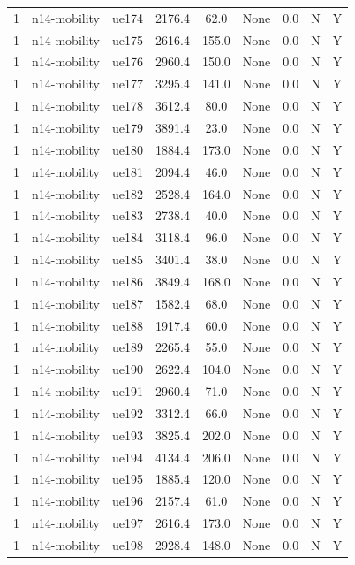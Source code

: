 \begin{table}[ht]
\begin{tabular}{|c|c|c|c|c|c|c|c|c|}
1 & n14-mobility & ue174 & 2176.4 & 62.0 & None & 0.0 & N & Y \\
1 & n14-mobility & ue175 & 2616.4 & 155.0 & None & 0.0 & N & Y \\
1 & n14-mobility & ue176 & 2960.4 & 150.0 & None & 0.0 & N & Y \\
1 & n14-mobility & ue177 & 3295.4 & 141.0 & None & 0.0 & N & Y \\
1 & n14-mobility & ue178 & 3612.4 & 80.0 & None & 0.0 & N & Y \\
1 & n14-mobility & ue179 & 3891.4 & 23.0 & None & 0.0 & N & Y \\
1 & n14-mobility & ue180 & 1884.4 & 173.0 & None & 0.0 & N & Y \\
1 & n14-mobility & ue181 & 2094.4 & 46.0 & None & 0.0 & N & Y \\
1 & n14-mobility & ue182 & 2528.4 & 164.0 & None & 0.0 & N & Y \\
1 & n14-mobility & ue183 & 2738.4 & 40.0 & None & 0.0 & N & Y \\
1 & n14-mobility & ue184 & 3118.4 & 96.0 & None & 0.0 & N & Y \\
1 & n14-mobility & ue185 & 3401.4 & 38.0 & None & 0.0 & N & Y \\
1 & n14-mobility & ue186 & 3849.4 & 168.0 & None & 0.0 & N & Y \\
1 & n14-mobility & ue187 & 1582.4 & 68.0 & None & 0.0 & N & Y \\
1 & n14-mobility & ue188 & 1917.4 & 60.0 & None & 0.0 & N & Y \\
1 & n14-mobility & ue189 & 2265.4 & 55.0 & None & 0.0 & N & Y \\
1 & n14-mobility & ue190 & 2622.4 & 104.0 & None & 0.0 & N & Y \\
1 & n14-mobility & ue191 & 2960.4 & 71.0 & None & 0.0 & N & Y \\
1 & n14-mobility & ue192 & 3312.4 & 66.0 & None & 0.0 & N & Y \\
1 & n14-mobility & ue193 & 3825.4 & 202.0 & None & 0.0 & N & Y \\
1 & n14-mobility & ue194 & 4134.4 & 206.0 & None & 0.0 & N & Y \\
1 & n14-mobility & ue195 & 1885.4 & 120.0 & None & 0.0 & N & Y \\
1 & n14-mobility & ue196 & 2157.4 & 61.0 & None & 0.0 & N & Y \\
1 & n14-mobility & ue197 & 2616.4 & 173.0 & None & 0.0 & N & Y \\
1 & n14-mobility & ue198 & 2928.4 & 148.0 & None & 0.0 & N & Y \\

\end{tabular}
\end{table}

